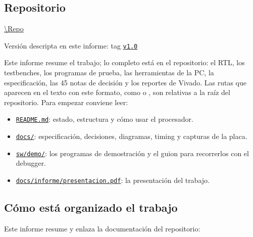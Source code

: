 \subsection{Repositorio}
\label{sec:repo}

\begin{nota}
\centering\normalsize
\url{\Repo}\par\smallskip
\small Versión descripta en este informe: tag \href{\Repo/tree/v1.0}{\texttt{v1.0}}
\end{nota}

Este informe resume el trabajo; lo completo está en el repositorio: el RTL, los testbenches, los
programas de prueba, las herramientas de la PC, la especificación, las 45 notas de decisión y los
reportes de Vivado. Las rutas que aparecen en el texto con este formato, como
 o , son relativas a la raíz del repositorio.
Para empezar conviene leer:

\begin{itemize}[nosep]
  \item \href{\Repo\#readme}{\texttt{README.md}}: estado, estructura y cómo usar el procesador.
  \item \href{\Repo/tree/master/docs}{\texttt{docs/}}: especificación, decisiones, diagramas,
        timing y capturas de la placa.
  \item \href{\Repo/tree/master/sw/demo}{\texttt{sw/demo/}}: los programas de demostración y el
        guion para recorrerlos con el debugger.
  \item \href{\Repo/blob/master/docs/informe/presentacion.pdf}{\texttt{docs/informe/presentacion.pdf}}:
        la presentación del trabajo.
\end{itemize}

\subsection{Cómo está organizado el trabajo}

Este informe resume y enlaza la documentación del repositorio:

